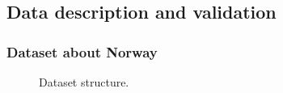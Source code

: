 \newpage

\subsection{Data description and validation}
\subsubsection{Dataset about Norway}

\begin{figure}[H]
    \caption{Dataset structure.}
\end{figure}

